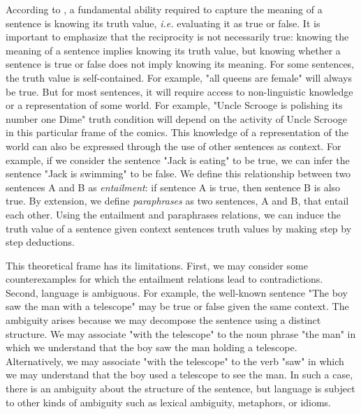 According to \textcite{fromkin_2017}, a fundamental ability required to capture the meaning of a sentence is knowing its truth value, \textit{i.e.} evaluating it as true or false. It is important to emphasize that the reciprocity is not necessarily true: knowing the meaning of a sentence implies knowing its truth value, but knowing whether a sentence is true or false does not imply knowing its meaning. For some sentences, the truth value is self-contained. For example, "all queens are female" will always be true. But for most sentences, it will require access to non-linguistic knowledge or a representation of some world. For example, "Uncle Scrooge is polishing its number one Dime" truth condition will depend on the activity of Uncle Scrooge in this particular frame of the comics. 
This knowledge of a representation of the world can also be expressed through the use of other sentences as context. For example, if we consider the sentence "Jack is eating" to be true, we can infer the sentence "Jack is swimming" to be false. We define this relationship between two sentences A and B as \textit{entailment}: if sentence A is true, then sentence B is also true. By extension, we define \textit{paraphrases} as two sentences, A and B, that entail each other. Using the entailment and paraphrases relations, we can induce the truth value of a sentence given context sentences truth values by making step by step deductions.


This theoretical frame has its limitations. First, we may consider some counterexamples for which the entailment relations lead to contradictions. Second, language is ambiguous. For example, the well-known sentence "The boy saw the man with a telescope" may be true or false given the same context. The ambiguity arises because we may decompose the sentence using a distinct structure. We may associate "with the telescope" to the noun phrase "the man" in which we understand that the boy saw the man holding a telescope. Alternatively, we may associate "with the telescope" to the verb "saw" in which we may understand that the boy used a telescope to see the man. In such a case, there is an ambiguity about the structure of the sentence, but language is subject to other kinds of ambiguity such as lexical ambiguity, metaphors, or idioms.

